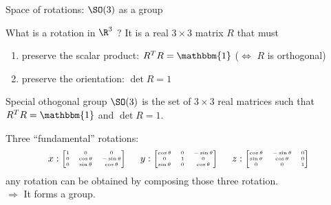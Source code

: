 \documentclass[9pt]{beamer}
\renewcommand{\emph}{\alert}
\begin{document}
\begin{frame}{Space of rotations: $\SO(3)$ as a group}
      
    What is a rotation in $\R^3$ ? It is a real $3\times3$ matrix $R$ that must
    \begin{enumerate}
        \item preserve the \emph{scalar product}: $R^TR=\mathbbm{1}$ ($\Leftrightarrow$ $R$ is orthogonal)
        \item preserve the \emph{orientation}: $\det R=1$
    \end{enumerate}

    \begin{block}{Special othogonal group}
        $\SO(3)$ is the set of $3\times 3$ real matrices such that $R^TR=\mathbbm{1}$ and $\det R=1$.
    \end{block}
    Three ``fundamental'' rotations:
    \begin{equation*}
      {\tiny
      x:
      \begin{bmatrix}
          1 & 0 & 0 \\
          0 & \cos\theta & -\sin\theta \\
          0 & \sin\theta & \cos\theta
      \end{bmatrix}\qquad
      y:
      \begin{bmatrix}
          \cos\theta & 0 & -\sin\theta \\
          0 & 1 & 0 \\
          \sin\theta & 0 & \cos\theta
      \end{bmatrix}\qquad
      z:
      \begin{bmatrix}
          \cos\theta & -\sin\theta & 0 \\
          \sin\theta & \cos\theta & 0 \\
          0 & 0 & 1
      \end{bmatrix}}
    \end{equation*}
    any rotation can be obtained by composing those three rotation.\\[0.2cm]

    $\Rightarrow$ It forms a \emph{group}.
    
\end{frame}
\end{document}
